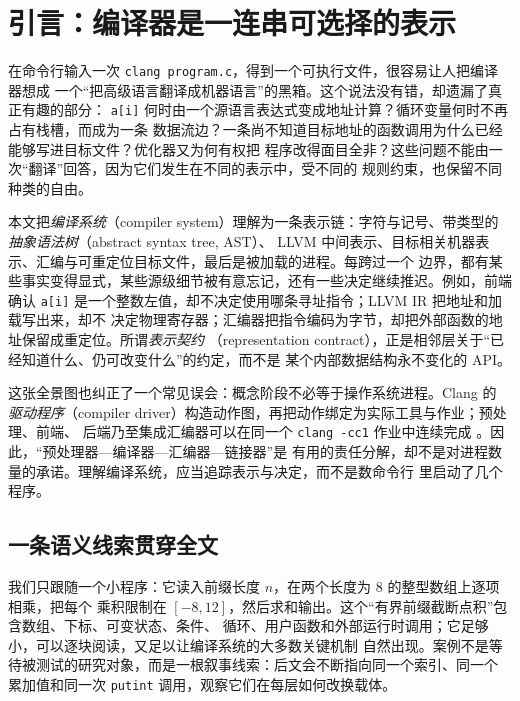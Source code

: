 \section{引言：编译器是一连串可选择的表示}
\label{sec:introduction}

在命令行输入一次 \texttt{clang program.c}，得到一个可执行文件，很容易让人把编译器想成
一个“把高级语言翻译成机器语言”的黑箱。这个说法没有错，却遗漏了真正有趣的部分：
\texttt{a[i]} 何时由一个源语言表达式变成地址计算？循环变量何时不再占有栈槽，而成为一条
数据流边？一条尚不知道目标地址的函数调用为什么已经能够写进目标文件？优化器又为何有权把
程序改得面目全非？这些问题不能由一次“翻译”回答，因为它们发生在不同的表示中，受不同的
规则约束，也保留不同种类的自由。

本文把\emph{编译系统}（compiler system）理解为一条表示链：字符与记号、带类型的
\emph{抽象语法树}（abstract syntax tree, AST）、
LLVM 中间表示、目标相关机器表示、汇编与可重定位目标文件，最后是被加载的进程。每跨过一个
边界，都有某些事实变得显式，某些源级细节被有意忘记，还有一些决定继续推迟。例如，前端确认
\texttt{a[i]} 是一个整数左值，却不决定使用哪条寻址指令；LLVM IR 把地址和加载写出来，却不
决定物理寄存器；汇编器把指令编码为字节，却把外部函数的地址保留成重定位。所谓\emph{表示契约}
（representation contract），正是相邻层关于“已经知道什么、仍可改变什么”的约定，而不是
某个内部数据结构永不变化的 API。



这张全景图也纠正了一个常见误会：概念阶段不必等于操作系统进程。Clang 的
\emph{驱动程序}（compiler driver）构造动作图，再把动作绑定为实际工具与作业；预处理、前端、
后端乃至集成汇编器可以在同一个 \texttt{clang -cc1} 作业中连续完成
\cite{front-clang-driver,front-clang-command}。因此，“预处理器—编译器—汇编器—链接器”是
有用的责任分解，却不是对进程数量的承诺。理解编译系统，应当追踪表示与决定，而不是数命令行
里启动了几个程序。

\subsection{一条语义线索贯穿全文}

我们只跟随一个小程序：它读入前缀长度 $n$，在两个长度为 8 的整型数组上逐项相乘，把每个
乘积限制在 $[-8,12]$，然后求和输出。这个“有界前缀截断点积”包含数组、下标、可变状态、条件、
循环、用户函数和外部运行时调用；它足够小，可以逐块阅读，又足以让编译系统的大多数关键机制
自然出现。案例不是等待被测试的研究对象，而是一根叙事线索：后文会不断指向同一个索引、同一个
累加值和同一次 \texttt{putint} 调用，观察它们在每层如何改换载体。

